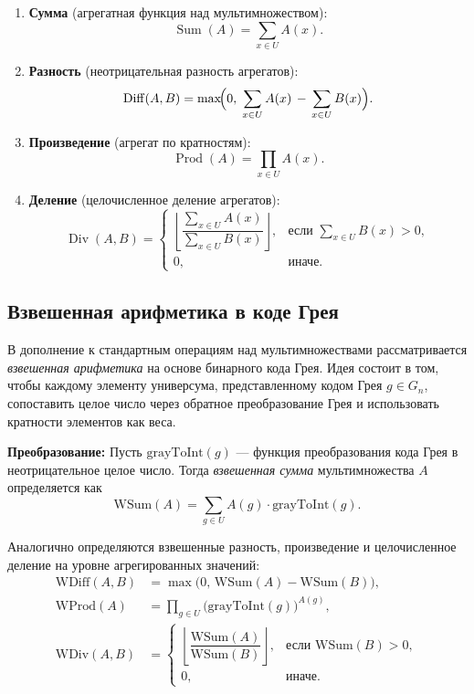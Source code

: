 \documentclass[12pt,a4paper]{article}
\begin{document}
\begin{enumerate}
    \item \textbf{Сумма} (агрегатная функция над мультимножеством):
    $$\operatorname{Sum}(A) = \sum_{x \in U} A(x).$$
    
    \item \textbf{Разность} (неотрицательная разность агрегатов):
    $$\operatorname{Diff}(A,B) = \max\!\Bigl(0,\; \sum_{x \in U} A(x) \, - \, \sum_{x \in U} B(x)\Bigr).$$
    
    \item \textbf{Произведение} (агрегат по кратностям):
    $$\operatorname{Prod}(A) = \prod_{x \in U} A(x).$$
    
    \item \textbf{Деление} (целочисленное деление агрегатов):
    $$\operatorname{Div}(A,B) =
    \begin{cases}
        \left\lfloor \dfrac{\sum_{x \in U} A(x)}{\sum_{x \in U} B(x)} \right\rfloor, & \text{если } \sum_{x \in U} B(x) > 0, \\
        0, & \text{иначе.}
    \end{cases}$$
\end{enumerate}

\subsection{Взвешенная арифметика в коде Грея}

В дополнение к стандартным операциям над мультимножествами рассматривается \textit{взвешенная арифметика} на основе бинарного кода Грея. Идея состоит в том, чтобы каждому элементу универсума, представленному кодом Грея $g \in G_n$, сопоставить целое число через обратное преобразование Грея и использовать кратности элементов как веса.

\textbf{Преобразование:} Пусть $\text{grayToInt}(g)$ — функция преобразования кода Грея в неотрицательное целое число. Тогда \textit{взвешенная сумма} мультимножества $A$ определяется как
$$\text{WSum}(A) = \sum_{g \in U} A(g) \cdot \text{grayToInt}(g).$$

Аналогично определяются взвешенные разность, произведение и целочисленное деление на уровне агрегированных значений:
\begin{align*}
\text{WDiff}(A,B) &= \max\bigl(0,\, \text{WSum}(A) - \text{WSum}(B)\bigr),\\
\text{WProd}(A) &= \prod_{g \in U} \bigl(\text{grayToInt}(g)\bigr)^{A(g)},\\
\text{WDiv}(A,B) &= \begin{cases}
\left\lfloor \dfrac{\text{WSum}(A)}{\text{WSum}(B)} \right\rfloor, & \text{если } \text{WSum}(B) > 0,\\
0, & \text{иначе.}
\end{cases}
\end{align*}
\end{document}
